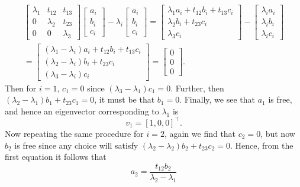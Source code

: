\documentclass{../../../kin_math}
\begin{document}
\begin{questions}
\begin{enumerate}
\begin{solution}
\begin{multline*}
        \begin{bmatrix} \lambda_1 & t_{12} & t_{13} \\ 0 & \lambda_2 & t_{23} \\ 0 & 0 & \lambda_3 \end{bmatrix} \begin{bmatrix} a_i \\ b_i \\ c_i \end{bmatrix} - \lambda_i \begin{bmatrix} a_i \\ b_i \\ c_i \end{bmatrix} = \begin{bmatrix} \lambda_1 a_i + t_{12}b_i + t_{13}c_i \\ \lambda_2 b_i + t_{23}c_i \\ \lambda_3 c_i \end{bmatrix} - \begin{bmatrix} \lambda_i a_i \\ \lambda_i b_i \\ \lambda_i c_i \end{bmatrix} \\
        = \begin{bmatrix} (\lambda_1 - \lambda_i)a_i + t_{12}b_i + t_{13}c_i \\ (\lambda_2 - \lambda_i)b_i + t_{23}c_i \\ (\lambda_3 - \lambda_i)c_i \end{bmatrix} = \begin{bmatrix} 0 \\ 0 \\ 0 \end{bmatrix}.
      \end{multline*}
      Then for $i = 1$, $c_1 = 0$ since $(\lambda_3 - \lambda_1)c_1 = 0$. Further, then $(\lambda_2 - \lambda_1)b_1 + t_{23}c_1 = 0$, it must be that $b_1 = 0$. Finally, we see that $a_1$ is free, and hence an eigenvector corresponding to $\lambda_1$ is
      \begin{equation*}
        v_1 = [1, 0, 0]^\top.
      \end{equation*}
      Now repeating the same procedure for $i = 2$, again we find that $c_2 = 0$, but now $b_2$ is free since any choice will satisfy $(\lambda_2 - \lambda_2)b_2 + t_{23}c_2 = 0$. Hence, from the first equation it follows that
      \begin{equation*}
        a_2  =  \frac{t_{12}b_2}{\lambda_2 - \lambda_1}

\end{equation*}
\end{solution}
\end{enumerate}
\end{questions}
\end{document}

